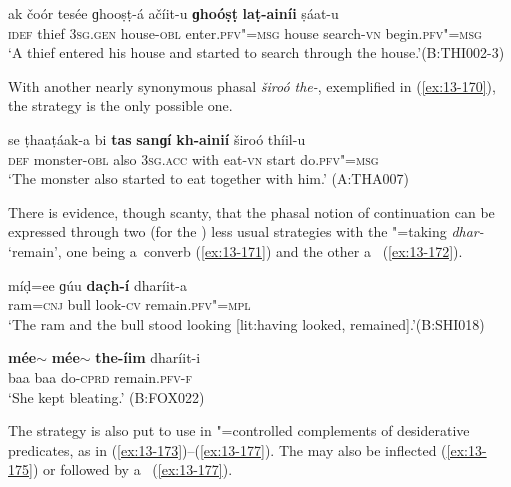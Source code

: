 \ea
\label{ex:13-169}
\gll ak čoór tesée ɡhooṣṭ-á ačíit-u \textbf{ɡhoóṣṭ} \textbf{laṭ-ainíi} ṣáat-u\\
\textsc{idef} thief \textsc{3sg.gen} house-\textsc{obl} enter.\textsc{pfv"=msg} house search-\textsc{vn} begin.\textsc{pfv"=msg}\\
\glt `A thief entered his house and started to search through the house.'\newline (B:THI002-3) 
\z

With another nearly synonymous phasal  \textit{široó the-}, exemplified in (\ref{ex:13-170}), the  strategy is the only possible one.

\begin{exe}
\ex
\label{ex:13-170}
\gll se ṭhaaṭáak-a bi \textbf{tas} \textbf{sanɡí} \textbf{kh-ainií}  široó thíil-u \\
\textsc{def} monster-\textsc{obl} also \textsc{3sg.acc} with eat-\textsc{vn} start do.\textsc{pfv"=msg} \\
\glt `The monster also started to eat together with him.' (A:THA007) 
\end{exe}

There is evidence, though scanty, that the phasal notion of continuation can be expressed through two (for the ) less usual strategies with the "=taking  \textit{dhar-} `remain', one being a~converb (\ref{ex:13-171}) and the other a~ (\ref{ex:13-172}).

\begin{exe}
\ex
\label{ex:13-171}
\gll míḍ=ee ɡúu \textbf{dac̣h-í} dharíit-a \\
ram=\textsc{cnj} bull look-\textsc{cv} remain.\textsc{pfv"=mpl} \\
\glt `The ram and the bull stood  looking [lit:having looked, remained].'\newline (B:SHI018)

\ex
\label{ex:13-172}
\gll \textbf{mée$\sim$} \textbf{mée$\sim$} \textbf{the-íim} dharíit-i  \\
baa baa do-\textsc{cprd} remain.\textsc{pfv-f} \\
\glt `She kept bleating.' (B:FOX022) 
\end{exe}

 The  strategy is also put to use in
"=controlled complements of desiderative predicates, as in
(\ref{ex:13-173})--(\ref{ex:13-177}). The  may also be inflected
(\ref{ex:13-175}) or followed by
a~ (\ref{ex:13-177}).

